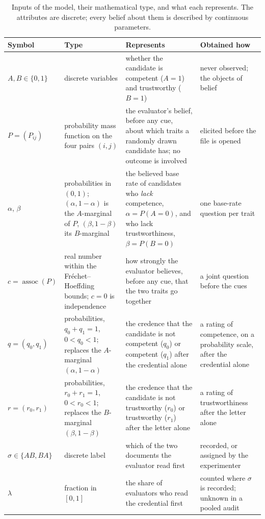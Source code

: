 \documentclass[11pt,a4paper]{article}
\newcommand{\assoc}{\operatorname{assoc}}
\begin{document}
\begin{table}[htbp]
\centering
\footnotesize
\caption{Inputs of the model, their mathematical type, and what each represents.
The attributes are discrete; every belief about them is described by continuous
parameters.}\label{tab:inputs}
\begin{tabular}{@{}p{2.4cm}p{3.0cm}p{4.6cm}p{4.6cm}@{}}
\toprule
\textbf{Symbol} & \textbf{Type} & \textbf{Represents} & \textbf{Obtained how}\\
\midrule
$A,B\in\{0,1\}$ & discrete variables & whether the candidate is competent ($A{=}1$) and trustworthy ($B{=}1$) & never observed; the objects of belief\\
\addlinespace
$P=(P_{ij})$ & probability mass function on the four pairs $(i,j)$ & the evaluator's belief, before any cue, about which traits a randomly drawn candidate has; no outcome is involved & elicited before the file is opened\\
\addlinespace
$\alpha$, $\beta$ & probabilities in $(0,1)$; $(\alpha,1-\alpha)$ is the $A$-marginal of $P$, $(\beta,1-\beta)$ its $B$-marginal & the believed base rate of candidates who \emph{lack} competence, $\alpha=P(A{=}0)$, and who lack trustworthiness, $\beta=P(B{=}0)$ & one base-rate question per trait\\
\addlinespace
$c=\assoc(P)$ & real number within the Fr\'echet--Hoeffding bounds; $c=0$ is independence & how strongly the evaluator believes, before any cue, that the two traits go together & a joint question before the cues\\
\addlinespace
$q=(q_0,q_1)$ & probabilities, $q_0+q_1=1$, $0<q_0<1$; replaces the $A$-marginal $(\alpha,1-\alpha)$ & the credence that the candidate is not competent ($q_0$) or competent ($q_1$) after the credential alone & a rating of competence, on a probability scale, after the credential alone\\
\addlinespace
$r=(r_0,r_1)$ & probabilities, $r_0+r_1=1$, $0<r_0<1$; replaces the $B$-marginal $(\beta,1-\beta)$ & the credence that the candidate is not trustworthy ($r_0$) or trustworthy ($r_1$) after the letter alone & a rating of trustworthiness after the letter alone\\
\addlinespace
$\sigma\in\{AB,BA\}$ & discrete label & which of the two documents the evaluator read first & recorded, or assigned by the experimenter\\
\addlinespace
$\lambda$ & fraction in $[0,1]$ & the share of evaluators who read the credential first & counted where $\sigma$ is recorded; unknown in a pooled audit\\

\end{tabular}
\end{table}
\end{document}
